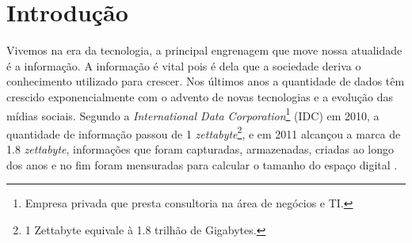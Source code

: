 \chapter[Introdução]{Introdução}

Vivemos na era da tecnologia, a principal engrenagem que move nossa atualidade é a informação.
A informação é vital pois é dela que a sociedade deriva o conhecimento utilizado para crescer. Nos
últimos anos a quantidade de dados têm crescido exponencialmente com o advento de novas tecnologias
e a evolução das mídias sociais. Segundo a \textit{International Data Corporation}\footnote{Empresa privada que
presta consultoria na área de negócios e TI.} (IDC) em 2010, a quantidade de informação passou de 1
\textit{zettabyte}\footnote{1 Zettabyte equivale à 1.8 trilhão de Gigabytes.}, e em 2011 alcançou a
marca de 1.8 \textit{zettabyte}, informações que foram capturadas, armazenadas, criadas ao longo dos anos e no
fim foram mensuradas para calcular o tamanho do espaço digital \cite{gantz2011}.